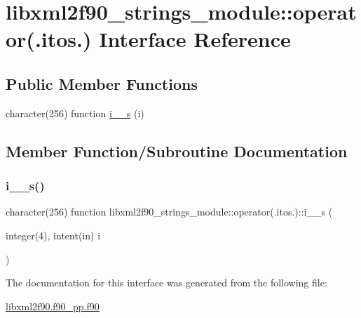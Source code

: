 \hypertarget{interfacelibxml2f90__strings__module_1_1operator_07_8itos_8_08}{}\section{libxml2f90\+\_\+strings\+\_\+module\+:\+:operator(.itos.) Interface Reference}
\label{interfacelibxml2f90__strings__module_1_1operator_07_8itos_8_08}
\subsection*{Public Member Functions}
\begin{DoxyCompactItemize}
\item 
character(256) function \hyperlink{interfacelibxml2f90__strings__module_1_1operator_07_8itos_8_08_ab70ef7b4f44f1adf98cce7b7805f4381}{i\+\_\+\_\+s} (i)
\end{DoxyCompactItemize}


\subsection{Member Function/\+Subroutine Documentation}
\mbox{\label{interfacelibxml2f90__strings__module_1_1operator_07_8itos_8_08_ab70ef7b4f44f1adf98cce7b7805f4381}} 
\subsubsection{\texorpdfstring{i\+\_\+\_\+s()}{i\_2\_s()}}
{\footnotesize\ttfamily character(256) function libxml2f90\+\_\+strings\+\_\+module\+::operator(.itos.)\+::i\+\_\+\_\+s (\begin{DoxyParamCaption}\item[{integer(4), intent(in)}]{i }\end{DoxyParamCaption})}



The documentation for this interface was generated from the following file\+:\begin{DoxyCompactItemize}
\item 
\hyperlink{libxml2f90_8f90__pp_8f90}{libxml2f90.\+f90\+\_\+pp.\+f90}\end{DoxyCompactItemize}
